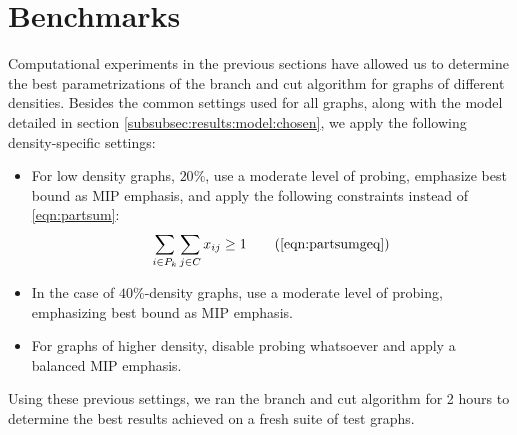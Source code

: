 
\section{Benchmarks}
\label{subsec:resultsbenchs}

Computational experiments in the previous sections have allowed us to determine the best parametrizations of the branch and cut algorithm for graphs of different densities. Besides the common settings used for all graphs, along with the model detailed in section \ref{subsubsec:results:model:chosen}, we apply the following density-specific settings:

\begin{itemize}

\item{For low density graphs, $20\%$, use a moderate level of probing, emphasize best bound as MIP emphasis, and apply the following constraints instead of \ref{eqn:partsum}:
\[
\sum_{i \in P_k} \sum_{j \in C} x_{ij} \geq 1 \tag{\ref{eqn:partsumgeq}}
\]}

\item{In the case of $40\%$-density graphs, use a moderate level of probing, emphasizing best bound as MIP emphasis.}

\item{For graphs of higher density, disable probing whatsoever and apply a balanced MIP emphasis.}

\end{itemize}

Using these previous settings, we ran the branch and cut algorithm for 2 hours to determine the best results achieved on a fresh suite of test graphs.

